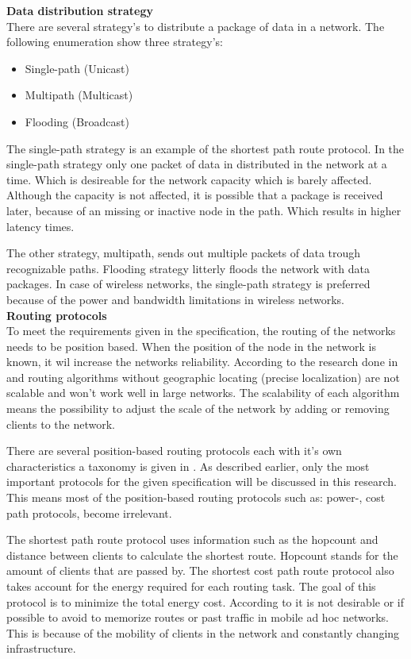 \documentclass[10pt,a4paper]{article}
\begin{document}
\textbf{Data distribution strategy}\\
There are several strategy's to distribute a package of data in a network. The following enumeration show three strategy's:
\begin{itemize}
\setlength\itemsep{0em}
    \item Single-path (Unicast)
    \item Multipath (Multicast)
    \item Flooding (Broadcast)
\end{itemize}

The single-path strategy is an example of the shortest path route protocol. In the single-path strategy only one packet of data in distributed in the network at a time. Which is desireable for the network capacity which is barely affected. Although the capacity is not affected, it is possible that a package is received later, because of an missing or inactive node in the path. \cite{position-based} Which results in higher latency times.

The other strategy, multipath, sends out multiple packets of data trough recognizable paths. Flooding strategy litterly floods the network with data packages. In case of wireless networks, the single-path strategy is preferred because of the power and bandwidth limitations in wireless networks. \cite{position-based}\\

\textbf{Routing protocols}\\
To meet the requirements given in the specification, the routing of the networks needs to be position based. When the position of the node in the network is known, it wil increase the networks reliability. \cite{position-based} According to the research done in \cite{geographicalrouting} and \cite{scalablelocation} routing algorithms without geographic locating (precise localization) are not scalable and won't work well in large networks.
The scalability of each algorithm means the possibility to adjust the scale of the network by adding or removing clients to the network.

There are several position-based routing protocols each with it's own characteristics a taxonomy is given in \cite{position-based}. As described earlier, only the most important protocols for the given specification will be discussed in this research. This means most of the position-based routing protocols such as: power-, cost path protocols, become irrelevant.

The shortest path route protocol uses information such as the hopcount and distance between clients to calculate the shortest route. Hopcount stands for the amount of clients that are passed by. The shortest cost path route protocol also takes account for the energy required for each routing task. The goal of this protocol is to minimize the total energy cost. According to \cite{position-based} it is not desirable or if possible to avoid to memorize routes or past traffic in mobile ad hoc networks. This is because of the mobility of clients in the network and constantly changing infrastructure.
\end{document}
